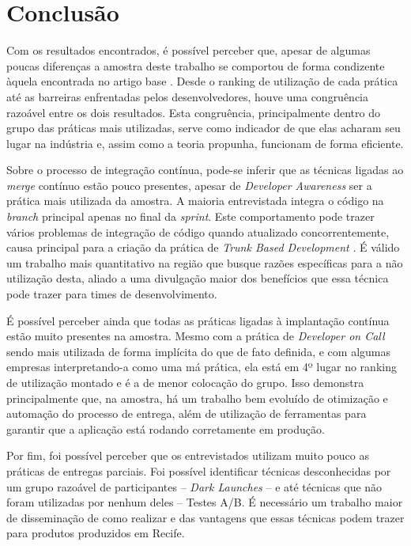 
\section{Conclusão}

Com os resultados encontrados, é possível perceber que, apesar de algumas poucas diferenças a amostra deste trabalho se comportou de forma condizente àquela encontrada no artigo base \cite{empiricalStudy2016}. Desde o ranking de utilização de cada prática até as barreiras enfrentadas pelos desenvolvedores, houve uma congruência razoável entre os dois resultados. Esta congruência, principalmente dentro do grupo das práticas mais utilizadas, serve como indicador de que elas acharam seu lugar na indústria e, assim como a teoria propunha, funcionam de forma eficiente.

Sobre o processo de integração contínua, pode-se inferir que as técnicas ligadas ao \emph{merge} contínuo estão pouco presentes, apesar de \emph{Developer Awareness} ser a prática mais utilizada da amostra. A maioria entrevistada integra o código na \emph{branch} principal apenas no final da \emph{sprint}. Este comportamento pode trazer vários problemas de integração de código quando atualizado concorrentemente, causa principal para a criação da prática de \emph{Trunk Based Development} \cite{devAndDeploymentFB}. É válido um trabalho mais quantitativo na região que busque razões específicas para a não utilização desta, aliado a uma divulgação maior dos benefícios que essa técnica pode trazer para times de desenvolvimento. 

É possível perceber ainda que todas as práticas ligadas à implantação contínua estão muito presentes na amostra. Mesmo com a prática de \emph{Developer on Call} sendo mais utilizada de forma implícita do que de fato definida, e com algumas empresas interpretando-a como uma má prática, ela está em 4º lugar no ranking de utilização montado e é a de menor colocação do grupo. Isso demonstra principalmente que, na amostra, há um trabalho bem evoluído de otimização e automação do processo de entrega, além de utilização de ferramentas para garantir que a aplicação está rodando corretamente em produção.

Por fim, foi possível perceber que os entrevistados utilizam muito pouco as práticas de entregas parciais. Foi possível identificar técnicas desconhecidas por um grupo razoável de participantes -- \emph{Dark Launches} -- e até técnicas que não foram utilizadas por nenhum deles -- Testes A/B. É necessário um trabalho maior de disseminação de como realizar e das vantagens que essas técnicas podem trazer para produtos produzidos em Recife.

